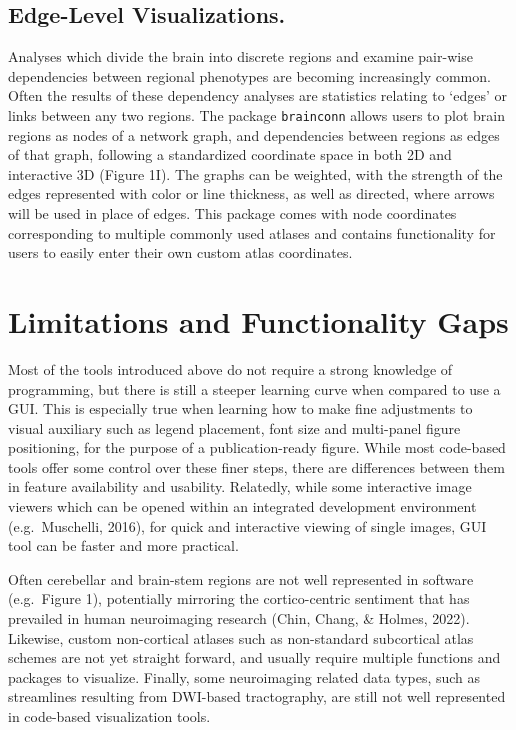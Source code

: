 \documentclass{article}
\begin{document}
\hypertarget{edge-level-visualizations.}{%
\subsection{Edge-Level Visualizations.}\label{edge-level-visualizations.}}

Analyses which divide the brain into discrete regions and examine pair-wise dependencies between regional phenotypes are becoming increasingly common. Often the results of these dependency analyses are statistics relating to `edges' or links between any two regions. The package \texttt{brainconn} allows users to plot brain regions as nodes of a network graph, and dependencies between regions as edges of that graph, following a standardized coordinate space in both 2D and interactive 3D (Figure 1I). The graphs can be weighted, with the strength of the edges represented with color or line thickness, as well as directed, where arrows will be used in place of edges. This package comes with node coordinates corresponding to multiple commonly used atlases and contains functionality for users to easily enter their own custom atlas coordinates.

\hypertarget{limitations-and-functionality-gaps}{%
\section{Limitations and Functionality Gaps}\label{limitations-and-functionality-gaps}}

Most of the tools introduced above do not require a strong knowledge of programming, but there is still a steeper learning curve when compared to use a GUI. This is especially true when learning how to make fine adjustments to visual auxiliary such as legend placement, font size and multi-panel figure positioning, for the purpose of a publication-ready figure. While most code-based tools offer some control over these finer steps, there are differences between them in feature availability and usability. Relatedly, while some interactive image viewers which can be opened within an integrated development environment (e.g.~Muschelli, 2016), for quick and interactive viewing of single images, GUI tool can be faster and more practical.

Often cerebellar and brain-stem regions are not well represented in software (e.g.~Figure 1), potentially mirroring the cortico-centric sentiment that has prevailed in human neuroimaging research (Chin, Chang, \& Holmes, 2022). Likewise, custom non-cortical atlases such as non-standard subcortical atlas schemes are not yet straight forward, and usually require multiple functions and packages to visualize. Finally, some neuroimaging related data types, such as streamlines resulting from DWI-based tractography, are still not well represented in code-based visualization tools.
\end{document}
